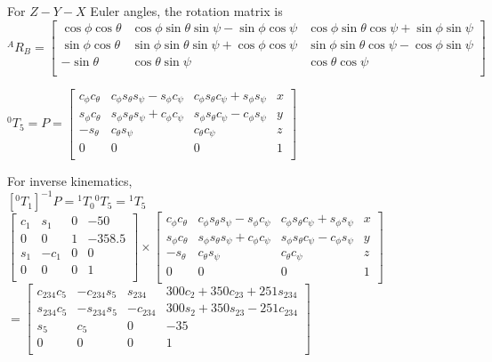 \documentclass[12pt, a4paper]{article}
\begin{document}
\begin{enumerate}[(1)]
For $Z-Y-X$ Euler angles, the rotation matrix is \\
${ }^{A} R_{B} = 
\begin{bmatrix}
\cos \phi \cos \theta & \cos \phi \sin \theta \sin \psi - \sin \phi \cos \psi & \cos \phi \sin \theta \cos \psi + \sin \phi \sin \psi \\
\sin \phi \cos \theta & \sin \phi \sin \theta \sin \psi + \cos \phi \cos \psi & \sin \phi \sin \theta \cos \psi - \cos \phi \sin \psi \\
-\sin \theta & \cos \theta \sin \psi &  \cos \theta \cos \psi \\
\end{bmatrix}$

${ }^{0} T_{5} = P =
\begin{bmatrix}
c_\phi c_\theta & c_\phi s_\theta s_\psi - s_\phi c_\psi & c_\phi s_\theta c_\psi + s_\phi s_\psi & x\\ 
s_\phi c_\theta & s_\phi s_\theta s_\psi + c_\phi c_\psi & s_\phi s_\theta c_\psi - c_\phi s_\psi & y\\
-s_\theta & c_\theta s_\psi &  c_\theta c_\psi & z\\
0 & 0 & 0 & 1\\
\end{bmatrix}$

For inverse kinematics, \\
$[{ }^{0} T_{1}]^{-1} P = { }^{1} T_{0} { }^{0} T_{5} = { }^{1} T_{5}$ \\
$\begin{bmatrix}
c_1 & s_1 & 0 & -50 \\
0 & 0 & 1 & -358.5 \\
s_1 & -c_1 & 0 & 0 \\
0 & 0 & 0 & 1 \\
\end{bmatrix}
\times
\begin{bmatrix}
c_\phi c_\theta & c_\phi s_\theta s_\psi - s_\phi c_\psi & c_\phi s_\theta c_\psi + s_\phi s_\psi & x\\ 
s_\phi c_\theta & s_\phi s_\theta s_\psi + c_\phi c_\psi & s_\phi s_\theta c_\psi - c_\phi s_\psi & y\\
-s_\theta & c_\theta s_\psi &  c_\theta c_\psi & z\\
0 & 0 & 0 & 1\\
\end{bmatrix}$ \\
$ = 
\begin{bmatrix}
c_{234}c_5 & -c_{234}s_5 & s_{234} & 300c_2+350c_{23}+251s_{234} \\
s_{234}c_5 & -s_{234}s_5 & -c_{234} & 300s_2+350s_{23}-251c_{234} \\
s_5 & c_5 & 0 & -35 \\
0 & 0 & 0 & 1 \\
\end{bmatrix}
$ 


\end{enumerate}
\end{document}
